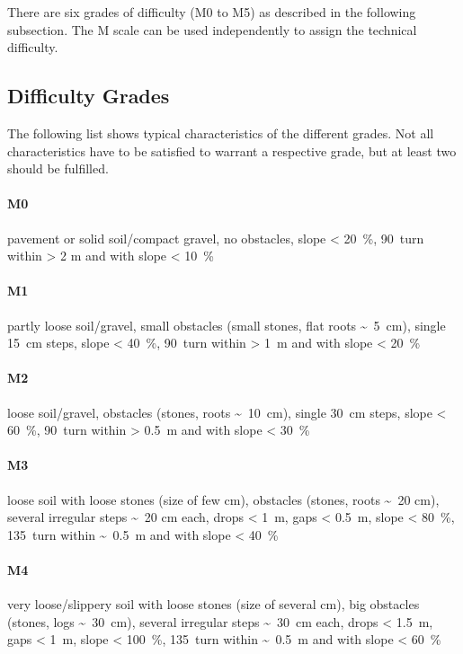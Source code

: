 \documentclass[a4paper,oneside]{scrartcl}
\begin{document}
There are six grades of difficulty (M0 to M5) as described in the following
subsection. The M scale can be used independently to assign the technical difficulty.

\subsection{Difficulty Grades}
\label{sec:m-scale-levels}
The following list shows typical characteristics of the different grades. Not all
characteristics have to be satisfied to warrant a respective grade, but at least
two should be fulfilled.

\paragraph{M0}
\hangindent=1cm
pavement or solid soil/compact gravel, no obstacles, slope < 20~\%,
90\textdegree\ turn within > 2 m and with slope < 10~\%

\paragraph{M1}
\hangindent=1cm
partly loose soil/gravel,
small obstacles (small stones, flat roots \textasciitilde\ 5~cm),
single 15~cm steps,
slope < 40~\%,
90\textdegree\ turn within > 1~m and with slope < 20~\%

\paragraph{M2}
\hangindent=1cm
loose soil/gravel,
obstacles (stones, roots \textasciitilde\ 10~cm),
single 30~cm steps,
slope < 60~\%,
90\textdegree\ turn within > 0.5~m and with slope < 30~\%

\paragraph{M3}
\hangindent=1cm
loose soil with loose stones (size of few cm),
obstacles (stones, roots \textasciitilde\ 20 cm),
several irregular steps \textasciitilde\ 20 cm each,
drops < 1~m, gaps < 0.5~m,
slope < 80~\%,
135\textdegree\ turn within \textasciitilde\ 0.5~m and with slope < 40~\%

\paragraph{M4}
\hangindent=1cm
very loose/slippery soil with loose stones (size of several cm),
big obstacles (stones, logs \textasciitilde\ 30~cm),
several irregular steps \textasciitilde\ 30~cm each,
drops < 1.5~m, gaps < 1~m,
slope < 100~\%,
135\textdegree\ turn within \textasciitilde\ 0.5~m and with slope < 60~\%
\end{document}
